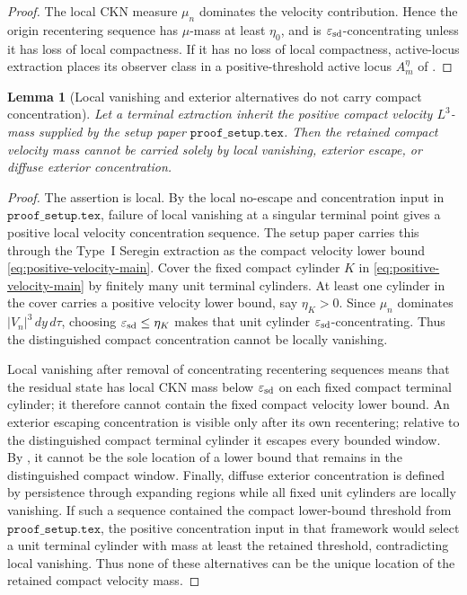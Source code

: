 \documentclass[11pt]{amsart}
\numberwithin{equation}{section}
\theoremstyle{plain}
\newtheorem{lemma}[theorem]{Lemma}
\theoremstyle{definition}
\theoremstyle{remark}
\newcommand{\eps}{\varepsilon}
\begin{document}
\begin{proof}
The local CKN measure \(\mu_n\) dominates the velocity contribution.  Hence the
origin recentering sequence has \(\mu\)-mass at least \(\eta_0\), and is
\(\eps_{\rm sd}\)-concentrating unless it has loss of local compactness.  If it
has no loss of local compactness, active-locus extraction places its observer
class in a positive-threshold active locus \(A_m^\eta\) of
.
\end{proof}

\begin{lemma}[Local vanishing and exterior alternatives do not carry compact concentration]
\label{lem:radiative-stratum-discharge}
Let a terminal extraction inherit the positive compact velocity \(L^3\)-mass
supplied by the setup paper \(\texttt{proof\_setup.tex}\).  Then the retained
compact velocity mass
cannot be carried solely by local vanishing, exterior escape, or diffuse
exterior concentration.
\end{lemma}

\begin{proof}
The assertion is local.  By the local no-escape and concentration input in
\(\texttt{proof\_setup.tex}\), failure of local vanishing at a singular terminal
point gives a positive local velocity concentration sequence.  The setup paper
carries this through the Type~I Seregin extraction as the compact velocity
lower bound \eqref{eq:positive-velocity-main}.  Cover the fixed compact
cylinder
\(K\) in \eqref{eq:positive-velocity-main} by finitely many unit terminal
cylinders.  At least one cylinder in the cover carries a positive velocity
lower bound, say \(\eta_K>0\).  Since \(\mu_n\) dominates
\(|V_n|^3\,dy\,d\tau\), choosing \(\eps_{\rm sd}\le\eta_K\) makes that unit
cylinder \(\eps_{\rm sd}\)-concentrating.  Thus the distinguished compact
concentration cannot be locally vanishing.

Local vanishing after removal of concentrating recentering sequences means
that the residual state has local CKN mass below \(\eps_{\rm sd}\) on each fixed
compact terminal cylinder; it therefore cannot contain the fixed compact
velocity lower bound.  An exterior escaping concentration is visible only after
its own recentering; relative to the distinguished compact terminal cylinder it
escapes every bounded window.  By
, it cannot be the sole location of a
lower bound that remains in the distinguished compact window.  Finally, diffuse
exterior concentration is defined by persistence through expanding regions
while all fixed unit cylinders are locally vanishing.  If such a sequence
contained the compact lower-bound threshold from \(\texttt{proof\_setup.tex}\), the
positive concentration input in that framework would select a unit terminal
cylinder with mass
at least the retained threshold, contradicting local vanishing.  Thus none of
these alternatives can be the unique location of the retained compact velocity
mass.
\end{proof}
\end{document}
